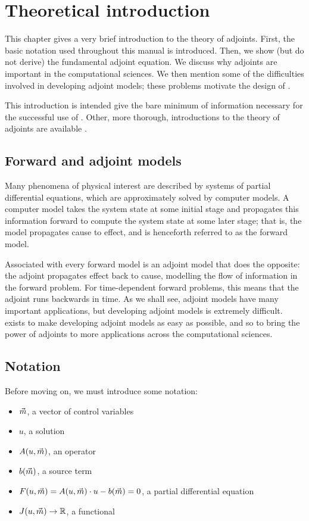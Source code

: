 \chapter{Theoretical introduction}

\begin{synopsis}
This chapter gives a very brief introduction to the theory of
adjoints. First, the basic notation used throughout this manual is introduced.
Then, we show (but do not derive) the fundamental adjoint equation.
We discuss why adjoints are important in the computational sciences.
We then mention some of the difficulties involved in developing adjoint models;
these problems motivate the design of \libadjoint.
\end{synopsis}
\vspace{3.0cm}
\minitoc

This introduction is intended give the bare minimum of information necessary for
the successful use of \libadjoint. Other, more thorough, introductions
to the theory of adjoints are available \citep{giles2000,errico1997,gunzburger2003,hinze2009}.
\newpage

\section{Forward and adjoint models}
Many phenomena of physical interest are described by systems of partial
differential equations, which are approximately solved by computer models.
A computer model takes the system state
at some initial stage and propagates this information forward
to compute the system state at some later stage; that is, the model propagates cause to effect, and is henceforth referred
to as the forward model.

Associated with every forward model is an adjoint model that does the opposite: the adjoint propagates effect back to cause,
modelling the flow of information in the forward problem. For time-dependent forward problems, this means that
the adjoint runs backwards in time. As we shall see, adjoint models have many important applications,
but developing adjoint models is extremely difficult. \libadjoint exists to make developing adjoint models
as easy as possible, and so to bring the power of adjoints to more applications across the computational
sciences.

\section{Notation}
Before moving on, we must introduce some notation:
\begin{itemize}
\item ${\vec{m}}$, a vector of control variables
\item $u$, a solution
\item $A(u, {\vec{m}})$, an operator
\item $b({\vec{m}})$, a source term
\item $F(u, {\vec{m}}) = A(u, {\vec{m}})\cdot u - b({\vec{m}}) = 0$, a partial differential equation
\item $J(u, {\vec{m}}) \rightarrow \mathbb{R}$, a functional
\end{itemize}

